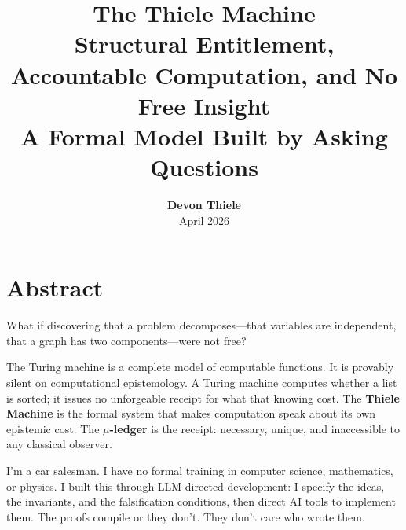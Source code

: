 \documentclass[9pt, a4paper, oneside, twocolumn]{extreport}
\title{
    \textbf{\Huge The Thiele Machine}\\
    \Large Structural Entitlement, Accountable Computation, and No Free Insight\\
    \large A Formal Model Built by Asking Questions
}
\author{
    \textbf{Devon Thiele}\\
    \normalsize April 2026
}
\date{}
\theoremstyle{plain}
\theoremstyle{definition}
\theoremstyle{remark}
\begin{document}
\twocolumn[
\maketitle
\thispagestyle{empty}
]

\chapter*{Abstract}

What if discovering that a problem decomposes---that variables are independent, that a graph has two components---were not free?

The Turing machine is a complete model of computable functions. It is provably silent on computational epistemology. A Turing machine computes whether a list is sorted; it issues no unforgeable receipt for what that knowing cost. The \textbf{Thiele Machine} is the formal system that makes computation speak about its own epistemic cost. The \textbf{$\mu$-ledger} is the receipt: necessary, unique, and inaccessible to any classical observer.

I'm a car salesman. I have no formal training in computer science, mathematics, or physics. I built this through LLM-directed development: I specify the ideas, the invariants, and the falsification conditions, then direct AI tools to implement them. The proofs compile or they don't. They don't care who wrote them.
\end{document}
